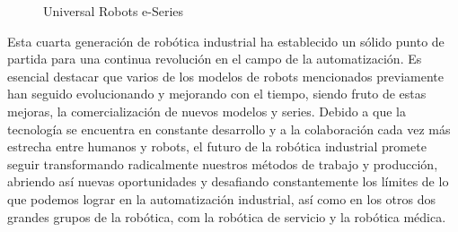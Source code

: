   \begin{figure}[h!]
    \begin{center}
      \subcapcentertrue
      \hspace{2mm}
    \end{center}
    \caption{Universal Robots e-Series}
    \label{fig:UR_e-Series}
  \end{figure}
	  
Esta cuarta generación de robótica industrial ha establecido un sólido punto de partida para una continua revolución en el campo de la automatización. 
Es esencial destacar que varios de los modelos de robots mencionados previamente han seguido evolucionando y mejorando con el tiempo, siendo fruto de estas mejoras, la comercialización de nuevos modelos y series. 
Debido a que la tecnología se encuentra en constante desarrollo y a la colaboración cada vez más estrecha entre humanos y robots, el futuro de la robótica industrial promete seguir transformando radicalmente nuestros métodos de trabajo y producción, abriendo así nuevas oportunidades y desafiando constantemente los límites de lo que podemos lograr en la automatización industrial, así como en los otros dos grandes grupos de la robótica, com la robótica de servicio y la robótica médica.


